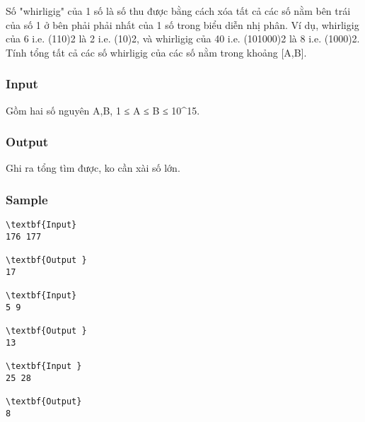 

Số "whirligig" của 1 số là số thu được bằng cách xóa tất cả các số nằm bên trái của số 1 ở bên phải phải nhất của 1 số trong biểu diễn nhị phân. Ví dụ, whirligig của 6 i.e. (110)2 là 2 i.e. (10)2, và whirligig của 40 i.e. (101000)2 là 8 i.e. (1000)2. Tính tổng tất cả các số whirligig của các số nằm trong khoảng [A,B].

\subsubsection{Input}

Gồm hai số nguyên A,B, 1 ≤ A ≤ B ≤ 10^15. 

\subsubsection{Output}

Ghi ra tổng tìm được, ko cần xài số lớn.

\subsubsection{Sample}
\begin{verbatim}
\textbf{Input} 
176 177
 
\textbf{Output }
17 

\textbf{Input} 
5 9 
 
\textbf{Output } 
13 

\textbf{Input } 
25 28 
 
\textbf{Output}
8 

\end{verbatim}
